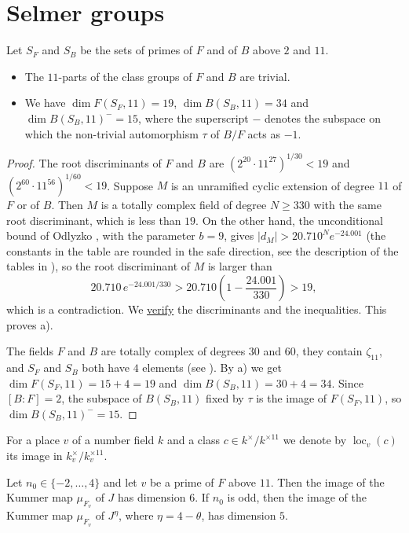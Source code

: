 \documentclass[11pt,reqno]{amsart}
\DeclareMathOperator{\loc}{loc}
\newcommand{\repocommit}{c12c8c3705ed0b6b52254df69bd5ffe84542d568}
\newcommand{\gitlink}[2]{\href{https://github.com/F-Najman/Xns-121-/blob/\repocommit/#1}{#2}}
\theoremstyle{definition}
\numberwithin{equation}{section}
\begin{document}
\section{Selmer groups}\label{sec:selmer}

\begin{lemma}\label{lem:class_groups}
Let $S_F$ and $S_B$ be the sets of primes of $F$ and of $B$ above $2$ and $11$.
\begin{itemize}
\item[a)] The $11$-parts of the class groups of $F$ and $B$ are trivial.
\item[b)] We have $\dim F(S_F,11)=19$, $\dim B(S_B,11)=34$ and $\dim B(S_B,11)^-=15$, where the superscript $-$ denotes the subspace on which the non-trivial automorphism $\tau$ of $B/F$ acts as $-1$.
\end{itemize}
\end{lemma}

\begin{proof}
The root discriminants of $F$ and $B$ are $(2^{20}\cdot 11^{27})^{1/30}<19$ and $(2^{60}\cdot 11^{56})^{1/60}<19$. Suppose $M$ is an unramified cyclic extension of degree $11$ of $F$ or of $B$. Then $M$ is a totally complex field of degree $N\geq 330$ with the same root discriminant, which is less than $19$. On the other hand, the unconditional bound of Odlyzko \cite[Table 4]{Odlyzko76}, with the parameter $b=9$, gives $|d_M|>20.710^{N}e^{-24.001}$ (the constants in the table are rounded in the safe direction, see the description of the tables in \cite{Odlyzko76}), so the root discriminant of $M$ is larger than
$$20.710\, e^{-24.001/330}>20.710\left(1-\frac{24.001}{330}\right)>19,$$
which is a contradiction. We \gitlink{code/class_groups.m}{verify} the discriminants and the inequalities. This proves a).

The fields $F$ and $B$ are totally complex of degrees $30$ and $60$, they contain $\zeta_{11}$, and $S_F$ and $S_B$ both have $4$ elements (see ). By a) we get $\dim F(S_F,11)=15+4=19$ and $\dim B(S_B,11)=30+4=34$. Since $[B:F]=2$, the subspace of $B(S_B,11)$ fixed by $\tau$ is the image of $F(S_F,11)$, so $\dim B(S_B,11)^-=15$.
\end{proof}

For a place $v$ of a number field $k$ and a class $c\in k^\times/k^{\times 11}$ we denote by $\loc_v(c)$ its image in $k_v^\times/k_v^{\times 11}$.

\begin{lemma}\label{lem:local_images}
Let $n_0\in\{-2,\ldots,4\}$ and let $v$ be a prime of $F$ above $11$. Then the image of the Kummer map $\mu_{F_v}$ of $J$ has dimension $6$. If $n_0$ is odd, then the image of the Kummer map $\mu_{F_v}$ of $J^\eta$, where $\eta=4-\theta$, has dimension $5$.
\end{lemma}
\end{document}
